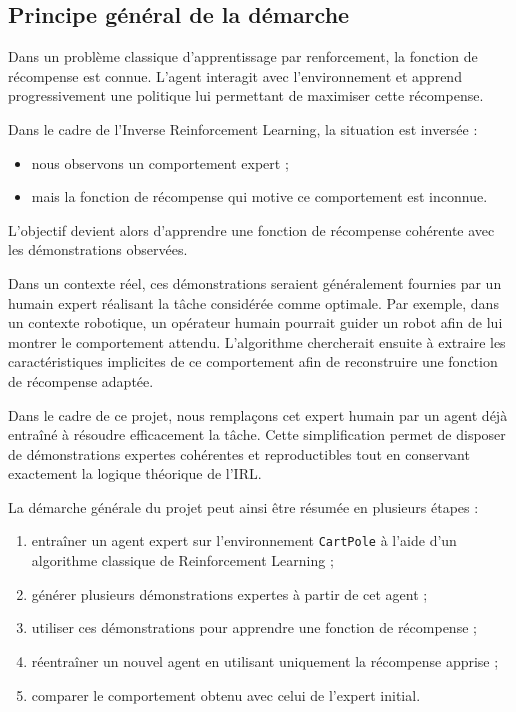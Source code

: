 \subsection{Principe général de la démarche}

Dans un problème classique d’apprentissage par renforcement, la fonction de récompense est connue. L’agent interagit avec l’environnement et apprend progressivement une politique lui permettant de maximiser cette récompense.

Dans le cadre de l’Inverse Reinforcement Learning, la situation est inversée :
\begin{itemize}
    \item nous observons un comportement expert ;
    \item mais la fonction de récompense qui motive ce comportement est inconnue.
\end{itemize}

L’objectif devient alors d’apprendre une fonction de récompense cohérente avec les démonstrations observées.

Dans un contexte réel, ces démonstrations seraient généralement fournies par un humain expert réalisant la tâche considérée comme optimale. Par exemple, dans un contexte robotique, un opérateur humain pourrait guider un robot afin de lui montrer le comportement attendu. L’algorithme chercherait ensuite à extraire les caractéristiques implicites de ce comportement afin de reconstruire une fonction de récompense adaptée.

Dans le cadre de ce projet, nous remplaçons cet expert humain par un agent déjà entraîné à résoudre efficacement la tâche. Cette simplification permet de disposer de démonstrations expertes cohérentes et reproductibles tout en conservant exactement la logique théorique de l’IRL.

La démarche générale du projet peut ainsi être résumée en plusieurs étapes :
\begin{enumerate}
    \item entraîner un agent expert sur l’environnement \texttt{CartPole} à l’aide d’un algorithme classique de Reinforcement Learning ;
    \item générer plusieurs démonstrations expertes à partir de cet agent ;
    \item utiliser ces démonstrations pour apprendre une fonction de récompense ;
    \item réentraîner un nouvel agent en utilisant uniquement la récompense apprise ;
    \item comparer le comportement obtenu avec celui de l’expert initial.
\end{enumerate}

